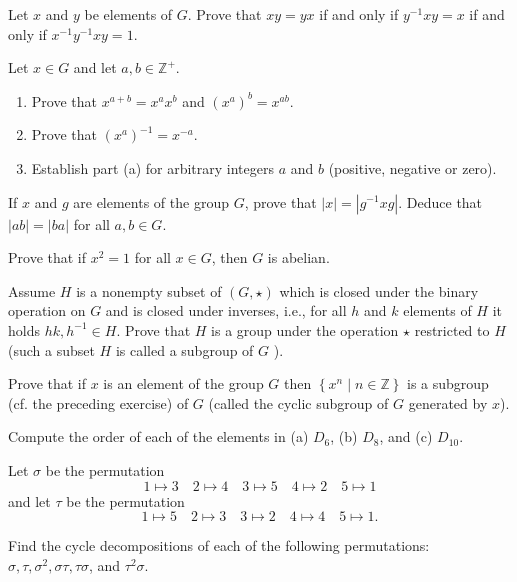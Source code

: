 \documentclass[
    11pt,a4paper,
]{exam}
\begin{document}
\begin{questions}
    
    \question
    Let \(x\) and \(y\) be elements of \(G\). Prove that \(x y=y x\) if and only if \(y^{-1} x y=x\) if and only if \(x^{-1} y^{-1} x y=1\).
    
    
    \question
    Let \(x \in G\) and let \(a, b \in \mathbb{Z}^{+}\).
    \begin{enumerate}[label=(\alph*)]
        \item Prove that \(x^{a+b}=x^a x^b \) and \(\left(x^a\right)^b=x^{a b}\).
        \item Prove that \(\left(x^a\right)^{-1}=x^{-a}\).
        \item Establish part (a) for arbitrary integers \(a\) and \(b\) (positive, negative or zero).
    \end{enumerate}
    
    
    
    \question 
    If \(x\) and \(g\) are elements of the group \(G\), prove that \(|x|=\left|g^{-1} x g\right|\). Deduce that \(|a b|=|b a|\) for all \(a, b \in G\).
    
    \question
     Prove that if \(x^2=1\) for all \(x \in G\), then \(G\) is abelian.
    
    \question
    Assume \({H}\) is a nonempty subset of \((G, \star)\) which is closed under the binary operation on \(G\) and is closed under inverses, i.e., for all \(h\) and \(k\) elements of \(H\) it holds    \(hk,h^{-1} \in H\). Prove that \(H\) is a group under the operation \(\star\) restricted to \(H\) (such a subset \(H\) is called a subgroup of \(G\) ).
    
    \question
    Prove that if \(x\) is an element of the group \(G\) then \(\left\{x^n \mid n \in \mathbb{Z}\right\}\) is a subgroup (cf. the preceding exercise) of \(G\) (called the cyclic subgroup of \(G\) generated by \(x\)).
    
    \question
    Compute the order of each of the elements in  (a) \(D_6\), (b) \(D_8\), and (c) \(D_{10}\).
    
    
    
    \question
    Let \(\sigma\) be the permutation
    \[
    1 \mapsto 3 \quad 2 \mapsto 4 \quad 3 \mapsto 5 \quad 4 \mapsto 2 \quad 5 \mapsto 1
    \]
    and let \(\tau\) be the permutation
    \[
    1 \mapsto 5 \quad 2 \mapsto 3 \quad 3 \mapsto 2 \quad 4 \mapsto 4 \quad 5 \mapsto 1 .
    \]
    
    Find the cycle decompositions of each of the following permutations: \(\sigma, \tau, \sigma^2, \sigma \tau, \tau \sigma\), and \(\tau^2 \sigma\).
    

\end{questions}
\end{document}
